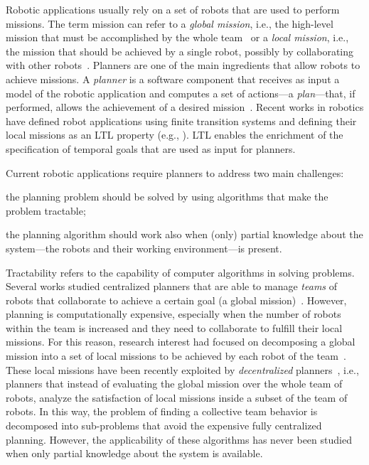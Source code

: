 Robotic applications usually rely on a set of robots that are used to perform missions.
The term mission can refer to a \emph{global mission}, i.e., the high-level mission that must be accomplished by the whole team~\cite{quottrup2004multi} or a \emph{local mission}, i.e., the mission that should be achieved by a single robot, possibly by collaborating with other robots~\cite{tumova2016multi}.
Planners are one of the main ingredients that allow robots to achieve  missions.
A \emph{planner} is  a software component that receives as input a model of the robotic application and computes  a set of actions---a \emph{plan}---that, if performed, allows the achievement of a desired mission~\cite{latombe2012robot}.
Recent works in robotics have defined robot applications using finite transition systems and defining their local missions as an LTL property (e.g., \cite{guo2015multi,tumova2016multi}).
LTL enables the enrichment of the specification of temporal goals that are used as input for planners.

Current robotic applications require planners to address two main challenges: 
\begin{enumerate*}
\item the planning problem should be solved by using algorithms that make the problem tractable;
\item the planning algorithm should work also when (only) partial knowledge about the system---the robots and their working environment---is present.
\end{enumerate*}

Tractability refers to the capability of computer algorithms in solving problems. 
Several works studied centralized planners that are able to manage \emph{teams} of robots that collaborate to achieve a certain goal (a global mission)~\cite{kloetzer2011multi,loizou2005automated,quottrup2004multi}.
However, planning is computationally expensive, especially when the number of robots within the team is increased and they need to collaborate to fulfill their local missions.
For this reason, research interest had focused on decomposing a global mission into a set of local missions to be achieved by each robot of the team~\cite{schillinger2016decomposition,guo2015multi,tumova2016multi}. 
These local missions have been recently exploited by \emph{decentralized} planners~\cite{tumova2016multi}, i.e., planners that instead of evaluating the global mission over the whole team of robots, analyze the satisfaction of local missions inside a subset of the team of robots. 
In this way, the problem of finding a collective team behavior is decomposed into sub-problems that avoid the expensive fully centralized planning. 
However, the applicability of these algorithms has never been studied when only partial knowledge about the system is available.



